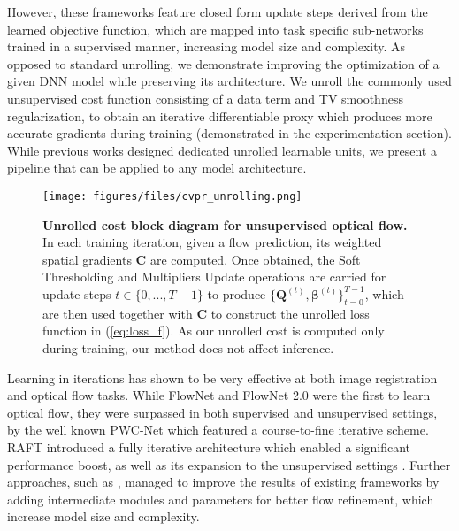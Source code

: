 \documentclass[10pt,twocolumn,letterpaper]{article}
\begin{document}
However, these frameworks feature closed form update steps derived from the learned objective function, which are mapped into task specific sub-networks trained in a supervised manner, increasing model size and complexity. As opposed to standard unrolling, we demonstrate improving the optimization of a given DNN model while preserving its architecture. We unroll the commonly used unsupervised cost function consisting of a data term and TV smoothness regularization, to obtain an iterative differentiable proxy which produces more accurate gradients during training (demonstrated in the experimentation section). While previous works designed dedicated unrolled learnable units, we present a pipeline that can be applied to any model architecture.


\begin{figure*}
\begin{center}
\texttt{[image: figures/files/cvpr\_unrolling.png]}
   \caption{\textbf{Unrolled cost block diagram for unsupervised optical flow.} 
   In each training iteration, given a flow prediction, its weighted spatial gradients $\mathbf{C}$ are computed.
   Once obtained, the Soft Thresholding and Multipliers Update operations are carried for update steps $t \in \{0,...,T-1\}$ to produce $\{\mathbf{Q}^{(t)},\boldsymbol{\beta}^{(t)} \}_{t=0}^{T-1}$, which are then used together with $\mathbf{C}$ to construct the unrolled loss function in \nolinebreak(\ref{eq:loss_f}). As our unrolled cost is computed only during training, our method does not affect inference.}
   
\label{fig:unrol_arch}
\end{center}
\end{figure*}
 
Learning in iterations has shown to be very effective at both image registration and optical flow tasks. While FlowNet and FlowNet 2.0 \cite{dosovitskiy2015flownet,ilg2017flownet} were the first to learn optical flow, they were surpassed in both supervised and unsupervised settings, by the well known PWC-Net \cite{Sun2018PWC-Net} which featured a course-to-fine iterative scheme. RAFT \cite{teed2020raft} introduced a fully iterative architecture which enabled a significant performance boost, as well as its expansion to the unsupervised settings \cite{stone2021smurf}. Further approaches, such as \cite{wang2016proximal,wang2020cot,luo2021upflow}, managed to improve the results of existing frameworks by adding intermediate modules and parameters for better flow refinement, which increase model size and complexity. 
\end{document}
